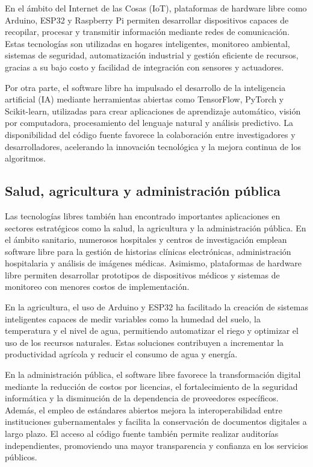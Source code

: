 \documentclass[12pt]{article}
\begin{document}
	En el ámbito del Internet de las Cosas (IoT), plataformas de hardware libre como Arduino, ESP32 y Raspberry Pi permiten desarrollar dispositivos capaces de recopilar, procesar y transmitir información mediante redes de comunicación. Estas tecnologías son utilizadas en hogares inteligentes, monitoreo ambiental, sistemas de seguridad, automatización industrial y gestión eficiente de recursos, gracias a su bajo costo y facilidad de integración con sensores y actuadores.
	
	Por otra parte, el software libre ha impulsado el desarrollo de la inteligencia artificial (IA) mediante herramientas abiertas como TensorFlow, PyTorch y Scikit-learn, utilizadas para crear aplicaciones de aprendizaje automático, visión por computadora, procesamiento del lenguaje natural y análisis predictivo. La disponibilidad del código fuente favorece la colaboración entre investigadores y desarrolladores, acelerando la innovación tecnológica y la mejora continua de los algoritmos.
	\subsection{Salud, agricultura y administración pública}
	
	Las tecnologías libres también han encontrado importantes aplicaciones en sectores estratégicos como la salud, la agricultura y la administración pública. En el ámbito sanitario, numerosos hospitales y centros de investigación emplean software libre para la gestión de historias clínicas electrónicas, administración hospitalaria y análisis de imágenes médicas. Asimismo, plataformas de hardware libre permiten desarrollar prototipos de dispositivos médicos y sistemas de monitoreo con menores costos de implementación.
	
	En la agricultura, el uso de Arduino y ESP32 ha facilitado la creación de sistemas inteligentes capaces de medir variables como la humedad del suelo, la temperatura y el nivel de agua, permitiendo automatizar el riego y optimizar el uso de los recursos naturales. Estas soluciones contribuyen a incrementar la productividad agrícola y reducir el consumo de agua y energía.
	
	En la administración pública, el software libre favorece la transformación digital mediante la reducción de costos por licencias, el fortalecimiento de la seguridad informática y la disminución de la dependencia de proveedores específicos. Además, el empleo de estándares abiertos mejora la interoperabilidad entre instituciones gubernamentales y facilita la conservación de documentos digitales a largo plazo. El acceso al código fuente también permite realizar auditorías independientes, promoviendo una mayor transparencia y confianza en los servicios públicos.
	
\end{document}
